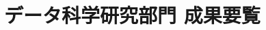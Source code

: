 \documentclass[11pt]{jarticle}
\begin{document}

%


%


%


%


%

\section{データ科学研究部門 成果要覧}


\end{document}
